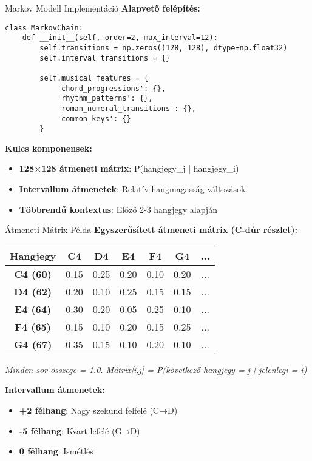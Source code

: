 \documentclass[aspectratio=169]{beamer}
\begin{document}
\begin{frame}[fragile]{Markov Modell Implementáció}
\textbf{Alapvető felépítés:}

\begin{lstlisting}
class MarkovChain:
    def __init__(self, order=2, max_interval=12):
        self.transitions = np.zeros((128, 128), dtype=np.float32)
        self.interval_transitions = {}
        
        self.musical_features = {
            'chord_progressions': {},
            'rhythm_patterns': {},
            'roman_numeral_transitions': {},
            'common_keys': {}
        }
\end{lstlisting}

\textbf{Kulcs komponensek:}
\begin{itemize}
    \item \textbf{128×128 átmeneti mátrix}: P(hangjegy\_j | hangjegy\_i)
    \item \textbf{Intervallum átmenetek}: Relatív hangmagasság változások
    \item \textbf{Többrendű kontextus}: Előző 2-3 hangjegy alapján
\end{itemize}
\end{frame}

\begin{frame}[fragile]{Átmeneti Mátrix Példa}
\textbf{Egyszerűsített átmeneti mátrix (C-dúr részlet):}

\vspace{0.5cm}

\begin{center}
\begin{tabular}{c|cccccc}
\textbf{Hangjegy} & \textbf{C4} & \textbf{D4} & \textbf{E4} & \textbf{F4} & \textbf{G4} & \textbf{...} \\
\hline
\textbf{C4 (60)} & 0.15 & 0.25 & 0.20 & 0.10 & 0.20 & ... \\
\textbf{D4 (62)} & 0.20 & 0.10 & 0.25 & 0.15 & 0.15 & ... \\
\textbf{E4 (64)} & 0.30 & 0.20 & 0.05 & 0.25 & 0.10 & ... \\
\textbf{F4 (65)} & 0.15 & 0.10 & 0.20 & 0.15 & 0.25 & ... \\
\textbf{G4 (67)} & 0.35 & 0.15 & 0.10 & 0.20 & 0.10 & ... \\
\end{tabular}
\end{center}

\vspace{0.3cm}

\textit{Minden sor összege = 1.0. Mátrix[i,j] = P(következő hangjegy = j | jelenlegi = i)}

\textbf{Intervallum átmenetek:}
\begin{itemize}
    \item \textbf{+2 félhang}: Nagy szekund felfelé (C→D)
    \item \textbf{-5 félhang}: Kvart lefelé (G→D)
    \item \textbf{0 félhang}: Ismétlés
\end{itemize}
\end{frame}
\end{document}
